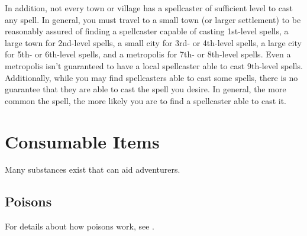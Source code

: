         \par In addition, not every town or village has a spellcaster of sufficient level to cast any spell. In general, you must travel to a small town (or larger settlement) to be reasonably assured of finding a spellcaster capable of casting 1st-level spells, a large town for 2nd-level spells, a small city for 3rd- or 4th-level spells, a large city for 5th- or 6th-level spells, and a metropolis for 7th- or 8th-level spells. Even a metropolis isn't guaranteed to have a local spellcaster able to cast 9th-level spells. Additionally, while you may find spellcasters able to cast some spells, there is no guarantee that they are able to cast the spell you desire. In general, the more common the spell, the more likely you are to find a spellcaster able to cast it.

\section{Consumable Items}\label{Consumable Items}

    Many substances exist that can aid adventurers.

    \subsection{Poisons}\label{Poisons}
        For details about how poisons work, see .

